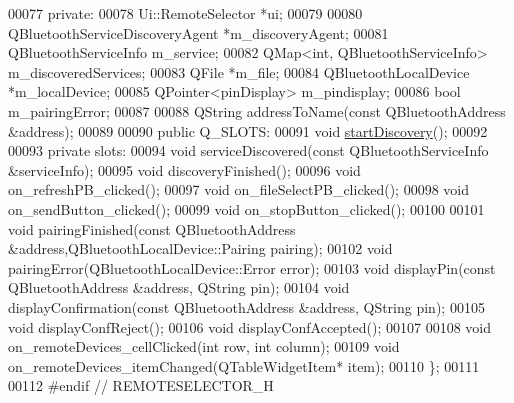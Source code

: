 \begin{DoxyCode}
00077 \textcolor{keyword}{private}:
00078     Ui::RemoteSelector *ui;
00079 
00080     QBluetoothServiceDiscoveryAgent *m\_discoveryAgent;
00081     QBluetoothServiceInfo m\_service;
00082     QMap<int, QBluetoothServiceInfo> m\_discoveredServices;
00083     QFile *m\_file;
00084     QBluetoothLocalDevice *m\_localDevice;
00085     QPointer<pinDisplay> m\_pindisplay;
00086     \textcolor{keywordtype}{bool} m\_pairingError;
00087 
00088     QString addressToName(\textcolor{keyword}{const} QBluetoothAddress &address);
00089 
00090 \textcolor{keyword}{public} Q\_SLOTS:
00091     \textcolor{keywordtype}{void} \hyperlink{classRemoteSelector_a63cf76514fa5b2bf1b85b87db1a49e99}{startDiscovery}();
00092 
00093 \textcolor{keyword}{private} slots:
00094     \textcolor{keywordtype}{void} serviceDiscovered(\textcolor{keyword}{const} QBluetoothServiceInfo &serviceInfo);
00095     \textcolor{keywordtype}{void} discoveryFinished();
00096     \textcolor{keywordtype}{void} on\_refreshPB\_clicked();
00097     \textcolor{keywordtype}{void} on\_fileSelectPB\_clicked();
00098     \textcolor{keywordtype}{void} on\_sendButton\_clicked();
00099     \textcolor{keywordtype}{void} on\_stopButton\_clicked();
00100 
00101     \textcolor{keywordtype}{void} pairingFinished(\textcolor{keyword}{const} QBluetoothAddress &address,QBluetoothLocalDevice::Pairing pairing);
00102     \textcolor{keywordtype}{void} pairingError(QBluetoothLocalDevice::Error error);
00103     \textcolor{keywordtype}{void} displayPin(\textcolor{keyword}{const} QBluetoothAddress &address, QString pin);
00104     \textcolor{keywordtype}{void} displayConfirmation(\textcolor{keyword}{const} QBluetoothAddress &address, QString pin);
00105     \textcolor{keywordtype}{void} displayConfReject();
00106     \textcolor{keywordtype}{void} displayConfAccepted();
00107 
00108     \textcolor{keywordtype}{void} on\_remoteDevices\_cellClicked(\textcolor{keywordtype}{int} row, \textcolor{keywordtype}{int} column);
00109     \textcolor{keywordtype}{void} on\_remoteDevices\_itemChanged(QTableWidgetItem* item);
00110 \};
00111 
00112 \textcolor{preprocessor}{#endif // REMOTESELECTOR\_H}
\end{DoxyCode}
